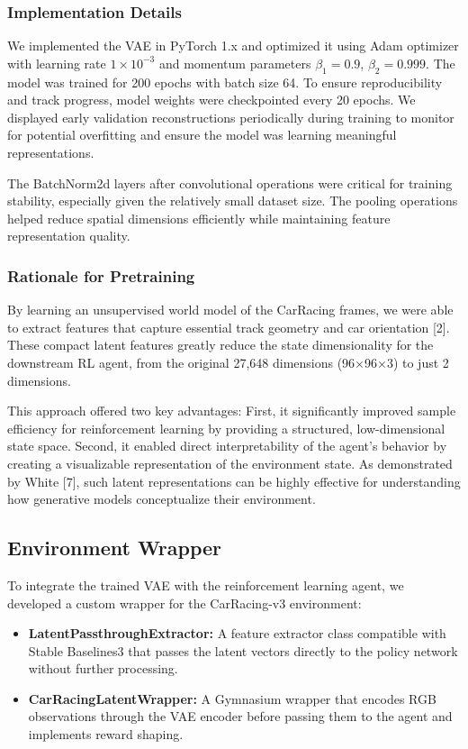 \documentclass[conference]{IEEEtran}
\begin{document}
\subsubsection{Implementation Details}
We implemented the VAE in PyTorch 1.x and optimized it using Adam optimizer with learning rate $1 \times 10^{-3}$ and momentum parameters $\beta_1 = 0.9$, $\beta_2 = 0.999$. The model was trained for 200 epochs with batch size 64. To ensure reproducibility and track progress, model weights were checkpointed every 20 epochs. We displayed early validation reconstructions periodically during training to monitor for potential overfitting and ensure the model was learning meaningful representations.

The BatchNorm2d layers after convolutional operations were critical for training stability, especially given the relatively small dataset size. The pooling operations helped reduce spatial dimensions efficiently while maintaining feature representation quality.

\subsubsection{Rationale for Pretraining}
By learning an unsupervised world model of the CarRacing frames, we were able to extract features that capture essential track geometry and car orientation [2]. These compact latent features greatly reduce the state dimensionality for the downstream RL agent, from the original 27,648 dimensions (96×96×3) to just 2 dimensions.

This approach offered two key advantages: First, it significantly improved sample efficiency for reinforcement learning by providing a structured, low-dimensional state space. Second, it enabled direct interpretability of the agent's behavior by creating a visualizable representation of the environment state. As demonstrated by White [7], such latent representations can be highly effective for understanding how generative models conceptualize their environment.

\subsection{Environment Wrapper}

To integrate the trained VAE with the reinforcement learning agent, we developed a custom wrapper for the CarRacing-v3 environment:

\begin{itemize}
    \item \textbf{LatentPassthroughExtractor:} A feature extractor class compatible with Stable Baselines3 that passes the latent vectors directly to the policy network without further processing.
    
    \item \textbf{CarRacingLatentWrapper:} A Gymnasium wrapper that encodes RGB observations through the VAE encoder before passing them to the agent and implements reward shaping.
\end{itemize}
\end{document}
